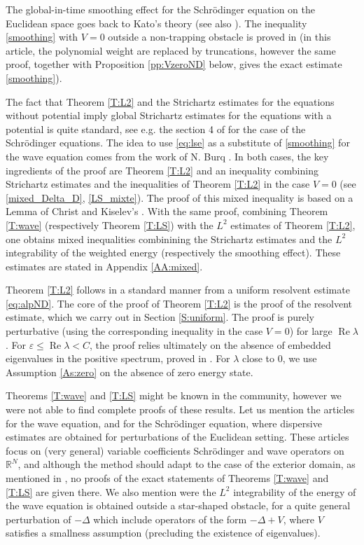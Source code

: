 \documentclass[10pt,leqno]{amsart}
\DeclareMathOperator{\re}{Re} %
\theoremstyle{definition}%
\theoremstyle{remark}
\numberwithin{equation}{section}
\newcommand{\R}{\mathbb{R}}
\def\eps{\varepsilon}
\renewcommand{\^}{\widehat}%
\begin{document}
The global-in-time smoothing effect for the Schr\"odinger equation on the Euclidean space goes back to Kato's theory \cite{Kato66} (see also \cite{Ve88}). The inequality \eqref{smoothing} with $V=0$ outside a non-trapping obstacle is proved in \cite{BuGeTz04a} (in this article, the polynomial weight are replaced by truncations, however the same proof, together with Proposition \ref{pp:VzeroND} below, gives the exact estimate \eqref{smoothing}).

The fact that Theorem \ref{T:L2} and the Strichartz estimates for the equations without potential imply global Strichartz estimates for the equations with a potential is quite standard, see e.g. the section 4 of \cite{RodnianskiSchlag04} for the case of the Schr\"odinger equations. The idea to use \eqref{eq:lse} as a substitute of \eqref{smoothing} for the wave equation comes from the work of N. Burq \cite{Burq03}. In both cases, the key ingredients of the proof are Theorem \ref{T:L2} and an inequality combining Strichartz estimates and the inequalities of Theorem \ref{T:L2} in the case $V=0$ (see \eqref{mixed_Delta_D}, \eqref{LS_mixte}). The proof of this mixed inequality is based on a Lemma of Christ and Kiselev's  \cite{ChKi01}. With the same proof, combining Theorem \ref{T:wave} (respectively Theorem \ref{T:LS}) with the $L^2$ estimates of Theorem \ref{T:L2}, one obtains mixed inequalities combinining the Strichartz estimates and the $L^2$ integrability of the weighted energy (respectively the smoothing effect). These estimates are stated in Appendix \ref{AA:mixed}.

Theorem \ref{T:L2} follows in a standard manner from a uniform resolvent estimate \eqref{eq:alpND}. The core of the proof of Theorem \ref{T:L2} is the proof of the resolvent estimate, which we carry out in Section \ref{S:uniform}. The proof is purely perturbative (using the corresponding inequality in the case $V=0$) for large $\re \lambda$. For $\eps\leq \re \lambda <C$, the proof relies ultimately on the absence of embedded eigenvalues in the positive spectrum, proved in \cite{IoJe03}. For $\lambda$ close to $0$, we use Assumption \ref{As:zero} on the absence of zero energy state.

Theorems \ref{T:wave} and \ref{T:LS} might be known in the community,
however we were not able to find complete proofs of these results.
Let us mention the articles \cite{MetcalfeTataru12} for the wave equation, and \cite{MaMeTa08} for the Schr\"odinger equation, where dispersive estimates are obtained for perturbations of the Euclidean setting. These articles focus on (very general) variable coefficients Schr\"odinger and wave operators on $\R^N$, and although the method should adapt to the case of the exterior domain, as mentioned in \cite[Subsection 1.2.2]{MaMeTa08}, no proofs of the exact statements of Theorems \ref{T:wave} and \ref{T:LS} are given there. We also mention \cite[Theorem 3]{MetcalfeTataru08} were the $L^2$ integrability of the energy of the wave equation is obtained outside a star-shaped obstacle, for a quite general perturbation of $-\Delta$ which include operators of the form $-\Delta+V$, where $V$ satisfies a smallness assumption (precluding the existence of eigenvalues).
\end{document}
